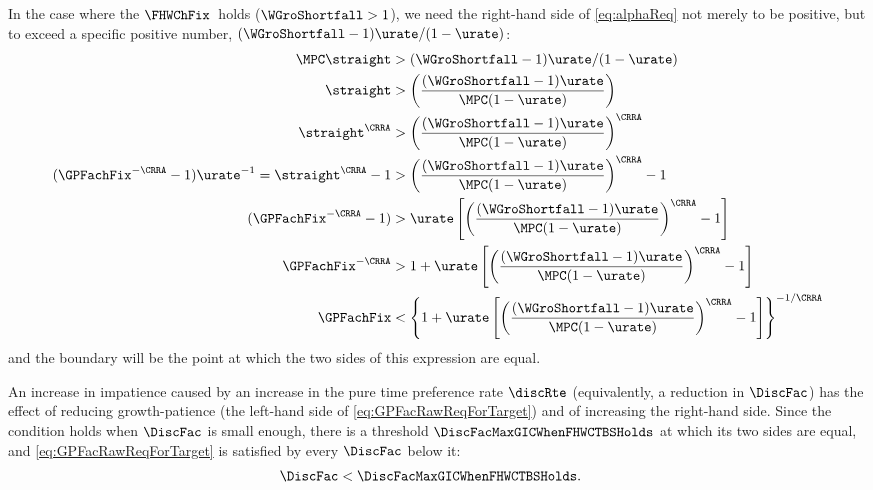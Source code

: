 \documentclass{econark}
\begin{document}
In the case where the $\FHWChFix$~holds ($\WGroShortfall > 1$), we need the right-hand side of \eqref{eq:alphaReq} not merely to be positive, but to exceed a specific positive number, $(\WGroShortfall-1)\urate/(1-\urate)$:  
\begin{equation}\begin{gathered}\begin{aligned}
    \MPC \straight & >  (\WGroShortfall-1)\urate/(1-\urate)
\\   \straight & >  \left(\frac{(\WGroShortfall-1)\urate}{\MPC (1-\urate)}\right)
\\   \straight^{\CRRA} & >  \left(\frac{(\WGroShortfall-1)\urate}{\MPC (1-\urate)}\right)^{\CRRA}
\\  (\GPFachFix^{-\CRRA}-1)\urate^{-1} = \straight^{\CRRA}-1 & >  \left(\frac{(\WGroShortfall-1)\urate}{\MPC (1-\urate)}\right)^{\CRRA}-1
\\  (\GPFachFix^{-\CRRA}-1) & >  \urate \left[\left(\frac{(\WGroShortfall-1)\urate}{\MPC (1-\urate)}\right)^{\CRRA}-1\right]
\\  \GPFachFix^{-\CRRA} & >  1  + \urate \left[\left(\frac{(\WGroShortfall-1)\urate}{\MPC (1-\urate)}\right)^{\CRRA}-1\right]
\\  \GPFachFix & <  \left\{1  + \urate \left[\left(\frac{(\WGroShortfall-1)\urate}{\MPC (1-\urate)}\right)^{\CRRA}-1\right] \right\}^{-1/\CRRA} \label{eq:GPFacRawReqForTarget}
\end{aligned}\end{gathered}\end{equation}
and the boundary will be the point at which the two sides of this expression are equal.  

An increase in impatience caused by an increase in the pure time preference rate $\discRte$ (equivalently, a reduction in $\DiscFac$) has the effect of reducing growth-patience (the left-hand side of \eqref{eq:GPFacRawReqForTarget}) and of increasing the right-hand side.  Since the condition holds when $\DiscFac$ is small enough, there is a threshold $\DiscFacMaxGICWhenFHWCTBSHolds$ at which its two sides are equal, and \eqref{eq:GPFacRawReqForTarget} is satisfied by every $\DiscFac$ below it:
\begin{equation}\begin{gathered}\begin{aligned}
  \DiscFac & <  \DiscFacMaxGICWhenFHWCTBSHolds \label{eq:DiscountMaxGICWhenFHWCTBSHolds}
.\end{aligned}\end{gathered}\end{equation}
\end{document}
